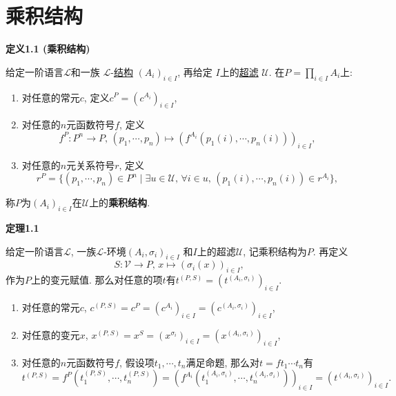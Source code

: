 \documentclass[UTF8]{ctexart}
\begin{document}
\setlength{\abovedisplayskip}{1pt}
\setlength{\belowdisplayskip}{1pt}

\section{乘积结构}

\hypertarget{sec:定义1.1}{}
\noindent\textbf{定义1.1 (乘积结构)}

给定一阶语言$\mathcal{L}$和一族
$\mathcal{L}$-\href{../01 一阶语言的结构/01 一阶语言的结构#nameddest=sec:定义1.1}
{结构} $(A_i)_{i\in I}$, 再给定
$I$上的\href{../../../01 基础集合论/06 滤子/03 超滤#nameddest=sec:定义1.1}{超滤}
$\mathcal{U}$.
在$\displaystyle P=\prod_{i\in I}A_i$上:
\begin{enumerate}
    \item 对任意的常元$c$, 定义$c^P=(c^{A_i})_{i\in I}$,
    \item 对任意的$n$元函数符号$f$, 定义
    \[
        f^P:P^n\to P,\,
        (p_1,\cdots,p_n)\mapsto(f^{A_i}(p_1(i),\cdots,p_n(i)))_{i\in I},
    \]
    \item 对任意的$n$元关系符号$r$, 定义
    \[
        r^P=\{(p_1,\cdots,p_n)\in P^n\mid\exists u\in\mathcal{U},\,
        \forall i\in u,\,(p_1(i),\cdots,p_n(i))\in r^{A_i}\},
    \]
\end{enumerate}
称$P$为$(A_i)_{i\in I}$在$\mathcal{U}$上的\textbf{乘积结构}.

\vspace{10pt}

\hypertarget{sec:定理1.1}{}
\noindent\textbf{定理1.1}

给定一阶语言$\mathcal{L}$, 一族$\mathcal{L}$-环境$(A_i,\sigma_i)_{i\in I}$
和$I$上的超滤$\mathcal{U}$, 记乘积结构为$P$. 再定义
\[
    S:\mathcal{V}\to P,\,x\mapsto(\sigma_i(x))_{i\in I},
\]
作为$P$上的变元赋值. 那么对任意的项$t$有$t^{(P,S)}=(t^{(A_i,\sigma_i)})_{i\in I}$.


\begin{enumerate}
    \item 对任意的常元$c$,
    $c^{(P,S)}=c^P=(c^{A_i})_{i\in I}=(c^{(A_i,\sigma_i)})_{i\in I}$,
    \item 对任意的变元$x$,
    $x^{(P,S)}=x^S=(x^{\sigma_i})_{i\in I}=(x^{(A_i,\sigma_i)})_{i\in I}$,
    \item 对任意的$n$元函数符号$f$, 假设项$t_1,\cdots,t_n$满足命题,
    那么对$t=ft_1\cdots t_n$有
    \begin{equation*}
        t^{(P,S)}=f^P(t_1^{(P,S)},\cdots,t_n^{(P,S)})
        =(f^{A_i}(t_1^{(A_i,\sigma_i)},\cdots,t_n^{(A_i,\sigma_i)}))_{i\in I}
        =(t^{(A_i,\sigma_i)})_{i\in I}.
    \tag*{\qedsymbol}\end{equation*}
\end{enumerate}
\end{document}
